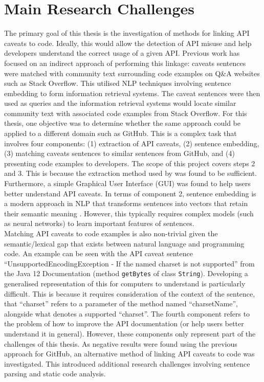\section{Main Research Challenges}
\label{sec:mainresearchchallenges}
The primary goal of this thesis is the investigation of methods for linking API caveats to code. Ideally, this would allow the detection of API misuse and help developers understand the correct usage of a given API. Previous work has focused on an indirect approach of performing this linkage: caveats sentences were matched with community text surrounding code examples on Q\&A websites such as Stack Overflow. This utilised NLP techniques involving sentence embedding to form information retrieval systems. The caveat sentences were then used as queries and the information retrieval systems would locate similar community text with associated code examples from Stack Overflow. For this thesis, one objective was to determine whether the same approach could be applied to a different domain such as GitHub. This is a complex task that involves four components: (1) extraction of API caveats, (2) sentence embedding, (3) matching caveats sentences to similar sentences from GitHub, and (4) presenting code examples to developers. The scope of this project covers steps 2 and 3. This is because the extraction method used by \cite{jiamou} was found to be sufficient. Furthermore, a simple Graphical User Interface (GUI) was found to help users better understand API caveats. In terms of component 2, sentence embedding is a modern approach in NLP that transforms sentences into vectors that retain their semantic meaning \cite{palangi2016deep}. However, this typically requires complex models (such as neural networks) to learn important features of sentences. \\

Matching API caveats to code examples is also non-trivial given the semantic/lexical gap that exists between natural language and programming code. An example can be seen with the API caveat sentence ``UnsupportedEncodingException - If the named charset is not supported'' from the Java 12 Documentation (method \lstinline{getBytes} of class \lstinline{String}). Developing a generalised representation of this for computers to understand is particularly difficult. This is because it requires consideration of the context of the sentence, that ``charset'' refers to a parameter of the method named ``charsetName'', alongside what denotes a supported ``charset''. The fourth component refers to the problem of how to improve the API documentation (or help users better understand it in general). However, these components only represent part of the challenges of this thesis. As negative results were found using the previous approach for GitHub, an alternative method of linking API caveats to code was investigated. This introduced additional research challenges involving sentence parsing and static code analysis.\\

